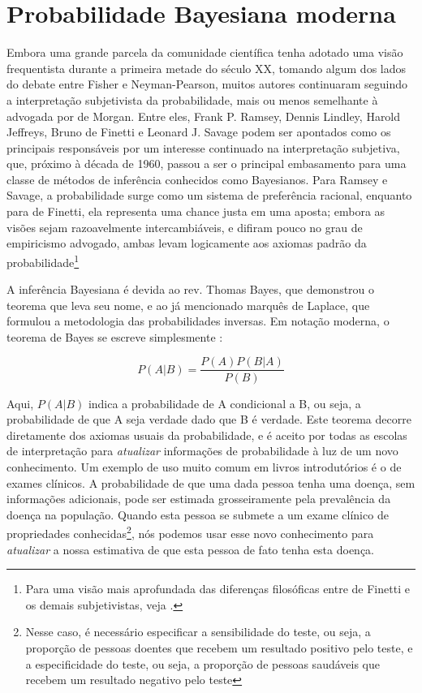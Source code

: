 \section{Probabilidade Bayesiana moderna}\label{sec:bayes}

Embora uma grande parcela da comunidade científica tenha adotado uma visão frequentista durante a primeira metade do século XX,
tomando algum dos lados do debate entre Fisher e Neyman-Pearson, muitos autores continuaram seguindo a interpretação 
subjetivista da probabilidade, mais ou menos semelhante à advogada por de Morgan. Entre eles, Frank P. Ramsey, Dennis Lindley,
Harold Jeffreys, Bruno de Finetti e Leonard J. Savage
podem ser apontados como os principais responsáveis por um interesse continuado na interpretação subjetiva, que, próximo à
década de 1960, passou a ser o principal embasamento para uma classe de métodos de inferência conhecidos como Bayesianos. 
Para Ramsey e Savage, a probabilidade surge como um sistema de preferência racional, enquanto para de Finetti, ela representa
uma chance justa em uma aposta; embora as visões sejam razoavelmente intercambiáveis, e difiram pouco 
no grau de empiricismo advogado,
ambas levam logicamente aos axiomas padrão da probabilidade\footnote{Para uma visão mais aprofundada das diferenças
filosóficas entre de Finetti e os demais subjetivistas, veja \citep{Galavotti89}.}

A inferência Bayesiana é devida ao rev. Thomas Bayes, que demonstrou o teorema que leva seu nome, e ao já mencionado marquês de
Laplace, que formulou a metodologia das probabilidades inversas. Em notação moderna, o teorema de Bayes se escreve simplesmente
\citep{Morettin09}:

\begin{equation}
	P(A|B) = \frac{P(A)P(B|A)}{P(B)}
\end{equation}

Aqui, $P(A|B)$ indica a probabilidade de A condicional a B, ou seja, a probabilidade de que A seja verdade dado que B é verdade.
Este teorema decorre diretamente dos axiomas usuais da probabilidade, e é aceito por todas as escolas de interpretação
para {\em atualizar} informações de probabilidade à luz de um novo conhecimento. Um exemplo de uso muito comum em livros
introdutórios é o de exames clínicos. A probabilidade de que uma dada pessoa tenha uma doença, sem informações adicionais,
pode ser estimada grosseiramente pela prevalência da doença na população. Quando esta pessoa se submete a um exame clínico
de propriedades conhecidas\footnote{Nesse caso, é necessário especificar a sensibilidade do teste, ou seja, 
a proporção de pessoas doentes que recebem um resultado positivo pelo teste, e a especificidade do teste, ou seja,
a proporção de pessoas saudáveis que recebem um resultado negativo pelo teste}, nós podemos usar esse novo conhecimento
para {\em atualizar} a nossa estimativa de que esta pessoa de fato tenha esta doença.

